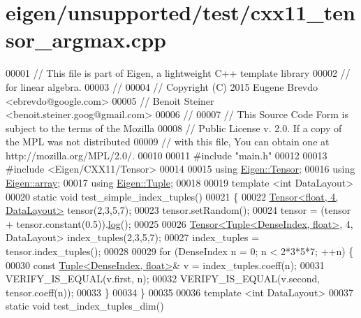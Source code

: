 \hypertarget{eigen_2unsupported_2test_2cxx11__tensor__argmax_8cpp_source}{}\section{eigen/unsupported/test/cxx11\+\_\+tensor\+\_\+argmax.cpp}
\label{eigen_2unsupported_2test_2cxx11__tensor__argmax_8cpp_source}

\begin{DoxyCode}
00001 \textcolor{comment}{// This file is part of Eigen, a lightweight C++ template library}
00002 \textcolor{comment}{// for linear algebra.}
00003 \textcolor{comment}{//}
00004 \textcolor{comment}{// Copyright (C) 2015 Eugene Brevdo <ebrevdo@google.com>}
00005 \textcolor{comment}{//                    Benoit Steiner <benoit.steiner.goog@gmail.com>}
00006 \textcolor{comment}{//}
00007 \textcolor{comment}{// This Source Code Form is subject to the terms of the Mozilla}
00008 \textcolor{comment}{// Public License v. 2.0. If a copy of the MPL was not distributed}
00009 \textcolor{comment}{// with this file, You can obtain one at http://mozilla.org/MPL/2.0/.}
00010 
00011 \textcolor{preprocessor}{#include "main.h"}
00012 
00013 \textcolor{preprocessor}{#include <Eigen/CXX11/Tensor>}
00014 
00015 \textcolor{keyword}{using} \hyperlink{class_eigen_1_1_tensor}{Eigen::Tensor};
00016 \textcolor{keyword}{using} \hyperlink{class_eigen_1_1array}{Eigen::array};
00017 \textcolor{keyword}{using} \hyperlink{struct_eigen_1_1_tuple}{Eigen::Tuple};
00018 
00019 \textcolor{keyword}{template} <\textcolor{keywordtype}{int} DataLayout>
00020 \textcolor{keyword}{static} \textcolor{keywordtype}{void} test\_simple\_index\_tuples()
00021 \{
00022   \hyperlink{class_eigen_1_1_tensor}{Tensor<float, 4, DataLayout>} tensor(2,3,5,7);
00023   tensor.setRandom();
00024   tensor = (tensor + tensor.constant(0.5)).\hyperlink{structlog}{log}();
00025 
00026   \hyperlink{class_eigen_1_1_tensor}{Tensor<Tuple<DenseIndex, float>}, 4, DataLayout> index\_tuples(2,3,5,7);
00027   index\_tuples = tensor.index\_tuples();
00028 
00029   \textcolor{keywordflow}{for} (DenseIndex n = 0; n < 2*3*5*7; ++n) \{
00030     \textcolor{keyword}{const} \hyperlink{struct_eigen_1_1_tuple}{Tuple<DenseIndex, float>}& v = index\_tuples.coeff(n);
00031     VERIFY\_IS\_EQUAL(v.first, n);
00032     VERIFY\_IS\_EQUAL(v.second, tensor.coeff(n));
00033   \}
00034 \}
00035 
00036 \textcolor{keyword}{template} <\textcolor{keywordtype}{int} DataLayout>
00037 \textcolor{keyword}{static} \textcolor{keywordtype}{void} test\_index\_tuples\_dim()

\end{DoxyCode}
